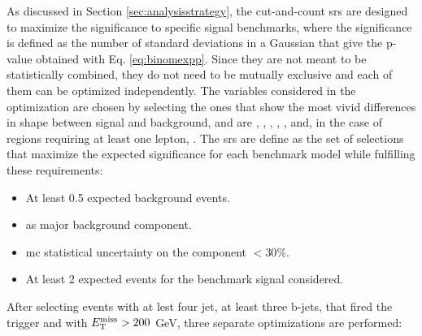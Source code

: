As discussed in Section \ref{sec:analysisstrategy}, the cut-and-count \glspl{sr} are designed to maximize the significance to specific 
signal benchmarks, where the significance is defined as the number of standard deviations in a Gaussian that give the p-value obtained with Eq. \ref{eq:binomexpp}.
Since they are not meant to be statistically combined, they do not need to be mutually exclusive and each of them can be optimized independently.
The variables considered in the optimization are chosen by selecting the ones that show the most vivid differences in shape between signal and background, and are \njet, \nbjet, \met, \meff, \mjsum, \mtb and, in the case of regions requiring at least one lepton, \mt.
The \glspl{sr} are define as the set of selections that maximize the expected significance for each benchmark model while fulfilling these requirements:
\begin{itemize}
\item At least 0.5 expected background events.
\item \ttbar as major background component.
\item \gls{mc} statistical uncertainty on the \ttbar component $<30$\%.
\item At least 2 expected events for the benchmark signal considered. 
\end{itemize}
After selecting events with at lest four jet, at least three b-jets, that fired the \met trigger and with $E_{\rm T}^{\mathrm{miss}}>200$ GeV, three separate optimizations are performed:


